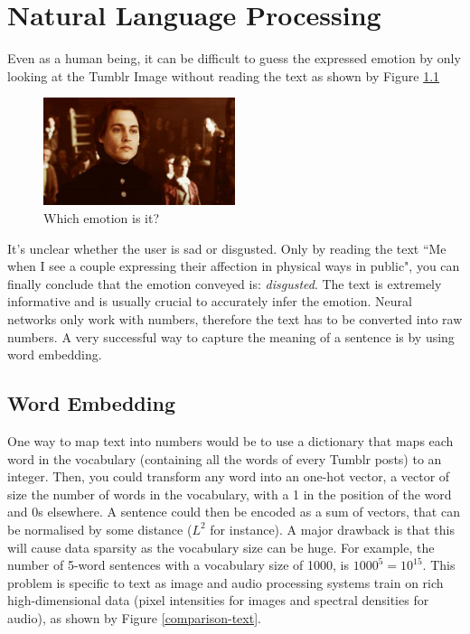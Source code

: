 \chapter{Natural Language Processing}
Even as a human being, it can be difficult to guess the expressed emotion by only looking at the Tumblr Image without reading the text as shown by Figure \ref{disgusted-unclear}

\begin{figure}[H]
    \centering
    \includegraphics[width=0.5\textwidth]{Images/disgusted.jpg}
    \caption{Which emotion is it?}
    \label{disgusted-unclear}
\end{figure}

It's unclear whether the user is sad or disgusted. Only by reading the text ``Me when I see a couple expressing their affection in physical ways in public", you can finally conclude that the emotion conveyed is: {\em disgusted}. The text is extremely informative and is usually crucial to accurately infer the emotion. Neural networks only work with numbers, therefore the text has to be converted into raw numbers. A very successful way to capture the meaning of a sentence is by using word embedding.
\newpage
\section{Word Embedding}
One way to map text into numbers would be to use a dictionary that maps each word in the vocabulary (containing all the words of every Tumblr posts) to an integer. Then, you could transform any word into an one-hot vector, a vector of size the number of words in the vocabulary, with a 1 in the position of the word and 0s elsewhere. A sentence could then be encoded as a sum of vectors, that can be normalised by some distance ($L^2$ for instance). A major drawback is that this will cause data sparsity as the vocabulary size can be huge. For example, the number of 5-word sentences with a vocabulary size of 1000, is $1000^5=10^{15}$. This problem is specific to text as image and audio processing systems train on rich high-dimensional data (pixel intensities for images and spectral densities for audio), as shown by Figure \ref{comparison-text}.

